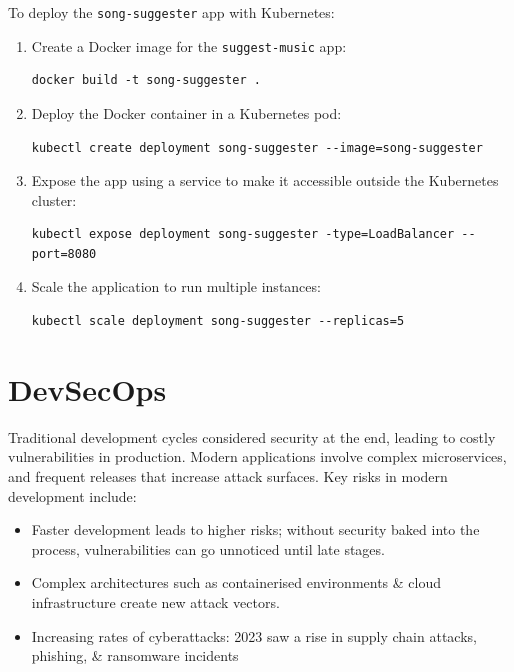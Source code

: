 \documentclass[a4paper,11pt]{article}
\begin{document}
To deploy the \verb|song-suggester| app with Kubernetes:
\begin{enumerate}
    \item   Create a Docker image for the \verb|suggest-music| app:
            \begin{verbatim}
docker build -t song-suggester .
            \end{verbatim}
    \item   Deploy the Docker container in a Kubernetes pod:
            \begin{verbatim}
kubectl create deployment song-suggester --image=song-suggester
            \end{verbatim}
    \item   Expose the app using a service to make it accessible outside the Kubernetes cluster:
            \begin{verbatim}
kubectl expose deployment song-suggester -type=LoadBalancer -- port=8080
            \end{verbatim}
    \item   Scale the application to run multiple instances:
            \begin{verbatim}
kubectl scale deployment song-suggester --replicas=5
            \end{verbatim}
\end{enumerate}

\section{DevSecOps}
Traditional development cycles considered security at the end, leading to costly vulnerabilities in production.
Modern applications involve complex microservices, and frequent releases that increase attack surfaces.
Key risks in modern development include:
\begin{itemize}
    \item   Faster development leads to higher risks; without security baked into the process, vulnerabilities
            can go unnoticed until late stages.
    \item   Complex architectures such as containerised environments \& cloud infrastructure create new attack
            vectors.
    \item   Increasing rates of cyberattacks: 2023 saw a rise in supply chain attacks, phishing, \& ransomware incidents
\end{itemize}
\end{document}
